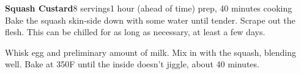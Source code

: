 \documentclass[../Cookbook.tex]{subfiles}
\begin{document}
\begin{recipe}[SquashCustard]{\textbf{Squash Custard}}{8 servings}{1 hour (ahead of time) prep, 40 minutes cooking}
	Bake the squash skin-side down with some water until tender.
	Scrape out the flesh. This can be chilled for as long as necessary, at least a few days.

	Whisk egg and preliminary amount of milk.
	Mix in with the squash, blending well.
	Bake at 350\0F until the inside doesn't jiggle, about 40%
	minutes.
\end{recipe}
\end{document}
